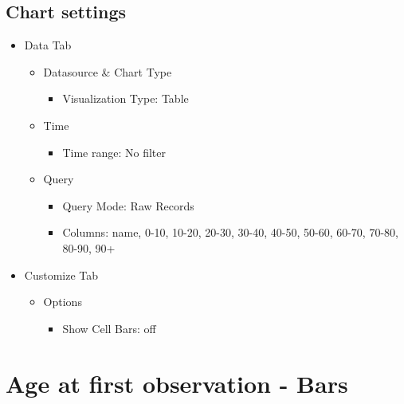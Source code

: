 \documentclass[
]{book}
\providecommand{\tightlist}{%
  \setlength{\itemsep}{0pt}\setlength{\parskip}{0pt}}
\begin{document}
\hypertarget{chart-settings-8}{%
\subsection{Chart settings}\label{chart-settings-8}}

\begin{itemize}
\item
  Data Tab

  \begin{itemize}
  \item
    Datasource \& Chart Type

    \begin{itemize}
    \tightlist
    \item
      Visualization Type: Table
    \end{itemize}
  \item
    Time

    \begin{itemize}
    \tightlist
    \item
      Time range: No filter
    \end{itemize}
  \item
    Query

    \begin{itemize}
    \item
      Query Mode: Raw Records
    \item
      Columns: name, 0-10, 10-20, 20-30, 30-40, 40-50, 50-60, 60-70, 70-80, 80-90, 90+
    \end{itemize}
  \end{itemize}
\item
  Customize Tab

  \begin{itemize}
  \item
    Options

    \begin{itemize}
    \tightlist
    \item
      Show Cell Bars: off
    \end{itemize}
  \end{itemize}
\end{itemize}

\hypertarget{age-at-first-observation---bars}{%
\section{Age at first observation - Bars}\label{age-at-first-observation---bars}}
\end{document}
